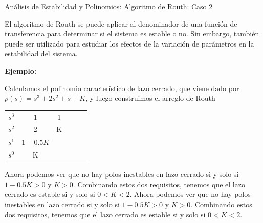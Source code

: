 \documentclass{beamer}
\begin{document}
\begin{frame}{Análisis de Estabilidad y Polinomios: Algoritmo de Routh: Caso 2}
\begin{justify}
\footnotesize
El algoritmo de Routh se puede aplicar al denominador de una función de transferencia para determinar si el sistema es estable o no. Sin embargo, también puede ser utilizado para estudiar los efectos de la variación de parámetros en la estabilidad del sistema. 

\vspace{0.2cm}
\textbf{Ejemplo:}

\vspace{0.2cm}
Calculamos el polinomio característico de lazo cerrado, que viene dado por $p(s) = s^3 + 2s^2 + s + K$, y luego construimos el arreglo de Routh


\begin{table}[t]
\begin{center}
\begin{tabular}{c|ccccc}
$s^3$ & 1 & 1 && \\
$s^2$ & 2 & K && \\
$s^1$ & $1 -0.5K$ & & & \\
$s^0$ & K & & & \\
\end{tabular}
\label{matriz Routh}
\end{center}
\end{table}


\vspace{0.1cm}
Ahora podemos ver que no hay polos inestables en lazo cerrado si y solo si $1 - 0.5K > 0$ y $K > 0$. Combinando estos dos requisitos, tenemos que el lazo cerrado es estable si y solo si $0 < K < 2$. Ahora podemos ver que no hay polos inestables en lazo cerrado si y solo si $1 - 0.5K > 0$ y $K > 0$. Combinando estos dos requisitos, tenemos que el lazo cerrado es estable si y solo si $0 < K < 2$.



\end{justify}
\end{frame}
\end{document}
